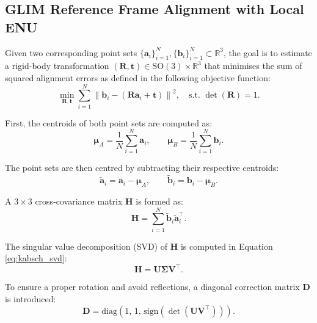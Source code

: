 \subsection{GLIM Reference Frame Alignment with Local ENU}

Given two corresponding point sets $\{\mathbf{a}_i\}_{i=1}^N, \{\mathbf{b}_i\}_{i=1}^N \subset \mathbb{R}^3$, the goal is to estimate a rigid-body transformation $(\mathbf{R}, \mathbf{t}) \in \mathrm{SO}(3) \times \mathbb{R}^3$ that minimises the sum of squared alignment errors as defined in the following objective function:
\begin{equation}
\label{eq:kabsch_objective}
\min_{\mathbf{R}, \mathbf{t}} \sum_{i=1}^{N} \left\| \mathbf{b}_i - (\mathbf{R}\mathbf{a}_i + \mathbf{t}) \right\|^2, \quad \text{s.t. } \det(\mathbf{R}) = 1.
\end{equation}

First, the centroids of both point sets are computed as:
\begin{equation}
\label{eq:centroids}
\boldsymbol{\mu}_A = \frac{1}{N} \sum_{i=1}^N \mathbf{a}_i, \qquad \boldsymbol{\mu}_B = \frac{1}{N} \sum_{i=1}^N \mathbf{b}_i.
\end{equation}

The point sets are then centred by subtracting their respective centroids:
\begin{equation}
\label{eq:centering}
\tilde{\mathbf{a}}_i = \mathbf{a}_i - \boldsymbol{\mu}_A, \qquad \tilde{\mathbf{b}}_i = \mathbf{b}_i - \boldsymbol{\mu}_B.
\end{equation}

A $3 \times 3$ cross-covariance matrix $\mathbf{H}$ is formed as:
\begin{equation}
\label{eq:cross_covariance}
\mathbf{H} = \sum_{i=1}^N \tilde{\mathbf{b}}_i \tilde{\mathbf{a}}_i^{\top}.
\end{equation}

The singular value decomposition (SVD) of $\mathbf{H}$ is computed in Equation \eqref{eq:kabsch_svd}:
\begin{equation}
\label{eq:kabsch_svd}
\mathbf{H} = \mathbf{U} \boldsymbol{\Sigma} \mathbf{V}^{\top}.
\end{equation}

To ensure a proper rotation and avoid reflections, a diagonal correction matrix $\mathbf{D}$ is introduced:
\begin{equation}
\label{eq:reflection_correction}
\mathbf{D} = \mathrm{diag}(1,\,1,\,\mathrm{sign}(\det(\mathbf{U}\mathbf{V}^{\top}))).
\end{equation}

